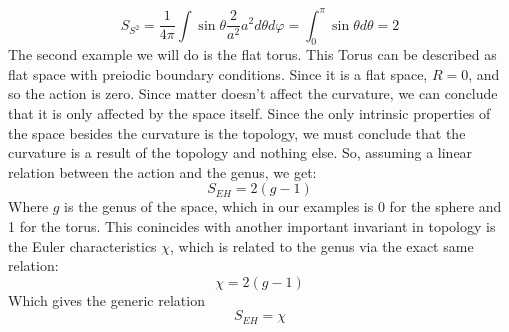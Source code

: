 \documentclass{article}
\begin{document}
\begin{equation}
    S_{S^2} = \frac{1}{4\pi}\int \sin\theta \frac{2}{a^2} a^2 d\theta d\varphi = \int_{0}^{\pi} \sin\theta d\theta = 2
\end{equation}
The second example we will do is the flat torus. This Torus can be described as flat space with preiodic boundary conditions. Since it is a flat space, $R = 0$, and so the action is zero.
\newline
\newline
Since matter doesn't affect the curvature, we can conclude that it is only affected by the space itself. Since the only intrinsic properties of the space besides the curvature is the topology, we must conclude that the curvature is a result of the topology and nothing else. So, assuming a linear relation between the action and the genus, we get:
\begin{equation}
    S_{EH} = 2(g - 1)
\end{equation}
Where $g$ is the genus of the space, which in our examples is 0 for the sphere and 1 for the torus. This conincides with another important invariant in topology is the Euler characteristics $\chi$, which is related to the genus via the exact same relation:
\begin{equation}
    \chi = 2(g - 1)
\end{equation}
Which gives the generic relation
\begin{equation}
    S_{EH} = \chi
\end{equation}
\end{document}
